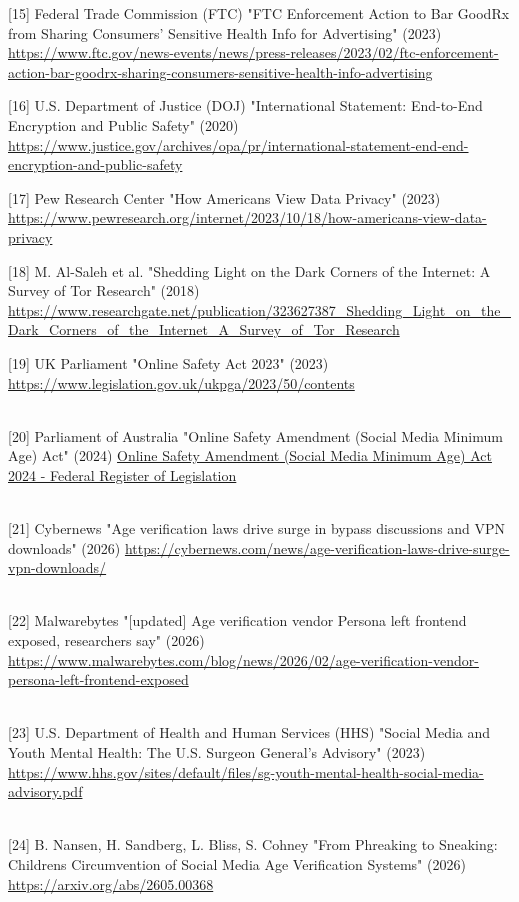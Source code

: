 \documentclass[
]{article}
\begin{document}
{[}15{]} Federal Trade Commission (FTC) "FTC Enforcement Action to Bar
GoodRx from Sharing Consumers' Sensitive Health Info for Advertising"
(2023)
\url{https://www.ftc.gov/news-events/news/press-releases/2023/02/ftc-enforcement-action-bar-goodrx-sharing-consumers-sensitive-health-info-advertising}

{[}16{]} U.S. Department of Justice (DOJ) "International Statement:
End-to-End Encryption and Public Safety" (2020)
\url{https://www.justice.gov/archives/opa/pr/international-statement-end-end-encryption-and-public-safety}

{[}17{]} Pew Research Center "How Americans View Data Privacy" (2023)
\url{https://www.pewresearch.org/internet/2023/10/18/how-americans-view-data-privacy}

{[}18{]} M. Al-Saleh et al. "Shedding Light on the Dark Corners of the
Internet: A Survey of Tor Research" (2018)
\url{https://www.researchgate.net/publication/323627387_Shedding_Light_on_the_Dark_Corners_of_the_Internet_A_Survey_of_Tor_Research}

{[}19{]} UK Parliament "Online Safety Act 2023" (2023)
\url{https://www.legislation.gov.uk/ukpga/2023/50/contents}\\
\strut \\
{[}20{]} Parliament of Australia "Online Safety Amendment (Social Media
Minimum Age) Act" (2024)
\href{https://www.legislation.gov.au/C2024A00127/asmade/text}{Online
Safety Amendment (Social Media Minimum Age) Act 2024 - Federal Register
of Legislation}\\
\strut \\
{[}21{]} Cybernews "Age verification laws drive surge in bypass
discussions and VPN downloads" (2026)
\href{https://www.google.com/search?q=https://cybernews.com/news/age-verification-laws-drive-surge-vpn-downloads/\&authuser=1}{https://cybernews.com/news/age-verification-laws-drive-surge-vpn-downloads/}\\
\strut \\
{[}22{]} Malwarebytes "{[}updated{]} Age verification vendor Persona
left frontend exposed, researchers say" (2026)
\url{https://www.malwarebytes.com/blog/news/2026/02/age-verification-vendor-persona-left-frontend-exposed}\\
\strut \\
{[}23{]} U.S. Department of Health and Human Services (HHS) "Social
Media and Youth Mental Health: The U.S. Surgeon General's Advisory"
(2023)
\url{https://www.hhs.gov/sites/default/files/sg-youth-mental-health-social-media-advisory.pdf}\\
\strut \\
{[}24{]} B. Nansen, H. Sandberg, L. Bliss, S. Cohney "From Phreaking to
Sneaking: Children\textquotesingle s Circumvention of Social Media Age
Verification Systems" (2026) \url{https://arxiv.org/abs/2605.00368}
\end{document}
